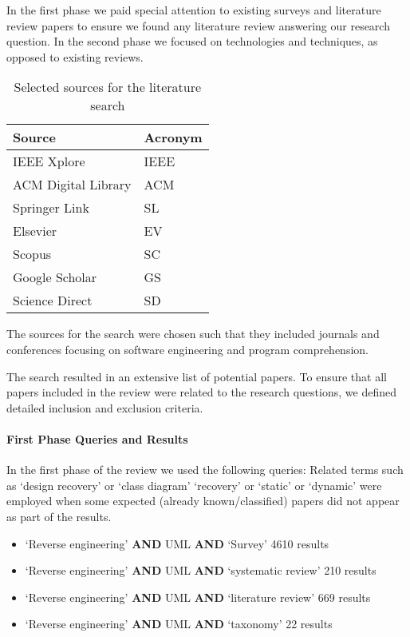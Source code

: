 In the first phase we paid special attention to  existing surveys and literature review papers to ensure we found any literature review answering our research question.
In the second phase we  focused on technologies and techniques, as opposed to existing reviews. 

\begin{table}[ht]
\caption{Selected sources for the literature search}
\label{table:sourcesReviewed}
\centering
\begin{tabular}{ll}
\toprule
\rowcolor[HTML]{BBDAFF}
\textbf{Source}   & \textbf{Acronym} \\ 
\hline
IEEE Xplore	& IEEE   \\ 
ACM Digital Library &	ACM   \\ 
Springer Link	&SL   \\ 
Elsevier	&EV   \\ 
Scopus & SC   \\ 
Google Scholar &	GS   \\ 
Science Direct &	SD   \\ 
\hline
\end{tabular}
\end{table}

The sources for the search were chosen such that they included journals and conferences focusing on software engineering and program comprehension. 

The search resulted in an extensive list of potential papers. To ensure that all papers included in the review were related to the research questions, we defined detailed inclusion and exclusion criteria.  

\paragraph*{First Phase Queries and Results}

In the first phase of the review we used the following queries:
Related terms such as `design recovery' or `class diagram' `recovery' or `static' or `dynamic' were employed when some expected (already known/classified) papers did not appear as part of the results.

\begin{itemize}
\item `Reverse engineering' \textbf{AND}  UML \textbf{AND} `Survey'  4610 results
\item `Reverse engineering' \textbf{AND}  UML \textbf{AND} `systematic review' 210 results
\item `Reverse engineering' \textbf{AND}  UML \textbf{AND} `literature review' 669 results
\item `Reverse engineering' \textbf{AND}  UML \textbf{AND} `taxonomy' 22 results
\end{itemize}

